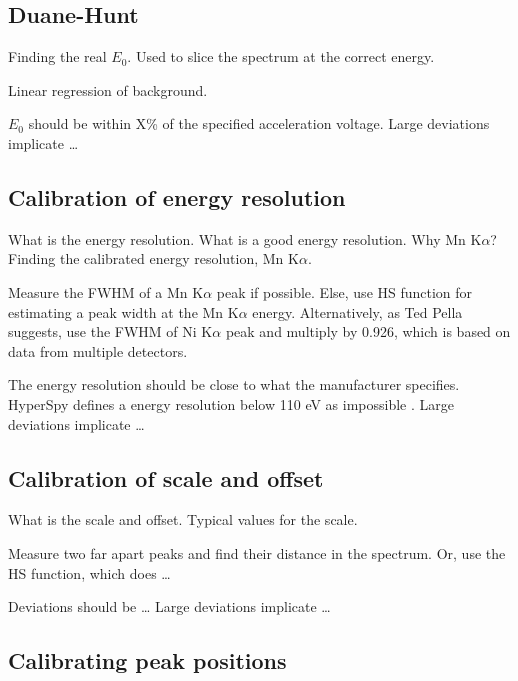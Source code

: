 \subsection{Duane-Hunt}
\label{theory:qc:duanehunt}

Finding the real $E_0$.
Used to slice the spectrum at the correct energy.

Linear regression of background.

$E_0$ should be within X\% of the specified acceleration voltage.
Large deviations implicate \dots

\subsection{Calibration of energy resolution}
\label{theory:qc:energyres}

What is the energy resolution.
What is a good energy resolution.
Why Mn K$\alpha$?
Finding the calibrated energy resolution, Mn K$\alpha$.

Measure the FWHM of a Mn K$\alpha$ peak if possible.
Else, use HS function for estimating a peak width at the Mn K$\alpha$ energy.
Alternatively, as Ted Pella suggests, use the FWHM of Ni K$\alpha$ peak and multiply by 0.926, which is based on data from multiple detectors.

The energy resolution should be close to what the manufacturer specifies.
HyperSpy defines a energy resolution below 110 eV as impossible .
Large deviations implicate \dots


\subsection{Calibration of scale and offset}
\label{theory:qc:scaleoffset}

What is the scale and offset.
Typical values for the scale.

Measure two far apart peaks and find their distance in the spectrum.
Or, use the HS function, which does \dots

Deviations should be \dots
Large deviations implicate \dots


\subsection{Calibrating peak positions}
\label{theory:qc:peakpositions}

